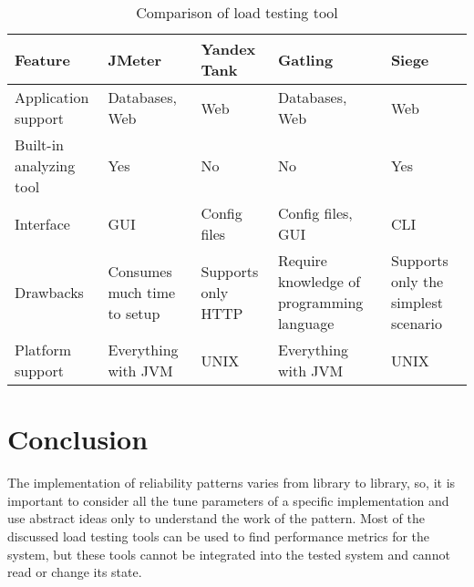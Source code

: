 \begin{longtable}[c]{|p{4cm}|p{2.5cm}|p{2.5cm}|p{2.5cm}|p{2.5cm}|}
    \caption{Comparison of load testing tool}
    \label{tab:load_tools} \\
    \hline
    \textbf{Feature}        & \textbf{JMeter}             & \textbf{Yandex Tank} & \textbf{Gatling}                          & \textbf{Siege}                      \\
    \endhead
    \hline
    Application support     & Databases, Web              & Web                  & Databases, Web                            & Web                                 \\
    \hline
    Built-in analyzing tool & Yes                         & No                   & No                                        & Yes                                 \\
    \hline
    Interface               & GUI                         & Config files         & Config files, GUI                         & CLI                                 \\
    \hline
    Drawbacks               & Consumes much time to setup & Supports only HTTP   & Require knowledge of programming language               & Supports only the simplest scenario              \\
    \hline
    Platform support        & Everything with JVM         & UNIX                 & Everything with JVM                       & UNIX                                \\
    \hline
\end{longtable}


\section{Conclusion}\label{sec:review_conclusion}
The implementation of reliability patterns varies from library to library, so, it is important to consider all the tune parameters of a specific implementation and use abstract ideas only to understand the work of the pattern.
Most of the discussed load testing tools can be used to find performance metrics for the system, but these tools cannot be integrated into the tested system and cannot read or change its state.